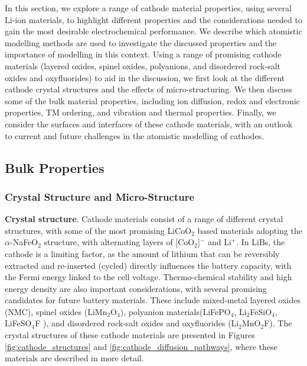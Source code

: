 \documentclass[../main.tex]{subfiles}
\begin{document}
 In this section, we explore a range of cathode material properties, using several Li-ion materials, to highlight different properties and the considerations needed to gain the most desirable electrochemical performance. We describe which atomistic modelling methods are used to investigate the discussed properties and the importance of modelling in this context. Using a range of promising cathode materials (layered oxides, spinel oxides, polyanions, and disordered rock-salt oxides and oxyfluorides) to aid in the discussion, we first look at the different cathode crystal structures and the effects of micro-structuring. We then discuss some of the bulk material properties, including ion diffusion, redox and electronic properties, TM ordering, and vibration and thermal properties. Finally, we consider the surfaces and interfaces of these cathode materials, with an outlook to current and future challenges in the atomistic modelling of cathodes.

\subsection{Bulk Properties}
\subsubsection{Crystal Structure and Micro-Structure}
\textbf{Crystal structure}. Cathode materials consist of a range of different crystal structures, with some of the most promising LiCoO$_2$ based materials adopting the $\alpha$-NaFeO$_2$ structure, with alternating layers of [CoO$_2$]$^-$ and Li$^+$. In LiBs, the cathode is a limiting factor, as the amount of lithium that can be reversibly extracted and re-inserted (cycled) directly influences the battery capacity, with the Fermi energy linked to the cell voltage. \cite{islam2014lithium} Thermo-chemical stability and high energy density are also important considerations, with several promising candidates for future battery materials. These include mixed-metal layered oxides (NMC), spinel oxides (LiMn$_2$O$_4$), polyanion materials(LiFePO$_4$, \cite{whittingham2008materials,masquelier2013polyanionic,goodenough_li-ion_2013, zaghib2013review} Li$_2$FeSiO$_4$, \cite{nyten2005electrochemical,sirisopanaporn2011polymorphism,islam2011silicate} LiFeSO$_4$F \cite{padhi1997mapping}), and disordered rock-salt oxides and oxyfluorides (Li$_2$MnO$_2$F\cite{Jacquet2019, clement2020, Chang2020, Tygesen2020, Sharpe2020}). The crystal structures of these cathode materials are presented in Figures \ref{fig:cathode_structures} and \ref{fig:cathode_diffusion_pathways}, where these materials are described in more detail.
\end{document}
